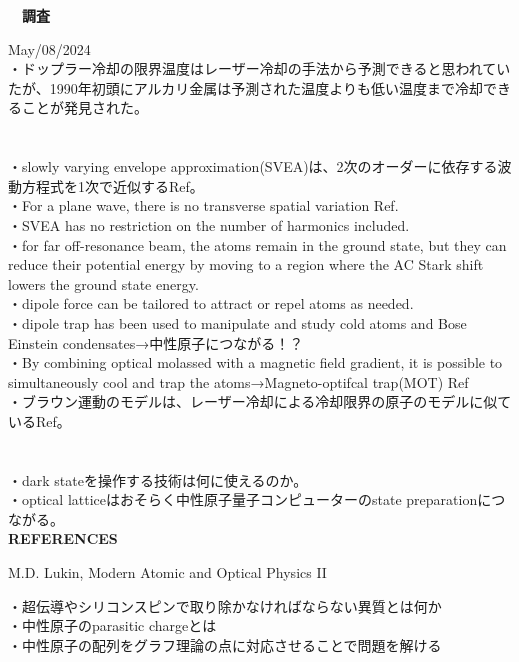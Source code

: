 \documentclass[a4paper,10.5pt]{ltjsarticle}
\begin{document}
\centerline
{\huge \bfseries　調査}
\rightline
{May/08/2024}
\leftline
{}
\\
・ドップラー冷却の限界温度はレーザー冷却の手法から予測できると思われていたが、1990年初頭にアルカリ金属は予測された温度よりも低い温度まで冷却できることが発見された。\\
\\
\\
・slowly varying envelope approximation(SVEA)は、2次のオーダーに依存する波動方程式を1次で近似するRef\cite{1}。\\
・For a plane wave, there is no transverse spatial variation Ref\cite{1}.\\
・SVEA has no restriction on the number of harmonics included.\\
・for far off-resonance beam, the atoms remain in the ground state, but they can reduce their potential energy by moving to a region where the AC Stark shift lowers the ground state energy.\\
・dipole force can be tailored to attract or repel atoms as needed.\\
・dipole trap has been used to manipulate and study cold atoms and Bose Einstein condensates→中性原子につながる！？\\
・By combining optical molassed with a magnetic field gradient, it is possible to simultaneously cool and trap the atoms→Magneto-optifcal trap(MOT) Ref\cite{1}\\
・ブラウン運動のモデルは、レーザー冷却による冷却限界の原子のモデルに似ているRef\cite{1}。\\
\\
\\
・dark stateを操作する技術は何に使えるのか。\\
・optical latticeはおそらく中性原子量子コンピューターのstate preparationにつながる。\\
\clearpage
{\Large \bfseries REFERENCES}
\begin{thebibliography}{1}
\vspace{-1.5cm}
   M.D. Lukin, Modern Atomic and Optical Physics II
\end{thebibliography}
\vspace{50pt}
・超伝導やシリコンスピンで取り除かなければならない異質とは何か\\
・中性原子のparasitic chargeとは\\
・中性原子の配列をグラフ理論の点に対応させることで問題を解ける\\
\end{document}
